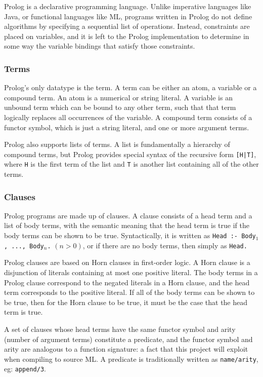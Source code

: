 \documentclass[12pt]{article}
\begin{document}
Prolog is a declarative programming language. 
Unlike imperative languages like Java, or functional languages like ML, programs written in Prolog do not define algorithms by specifying a sequential list of operations. 
Instead, constraints are placed on variables, and it is left to the Prolog implementation to determine in some way the variable bindings that satisfy those constraints. 

\subsubsection{Terms}

Prolog's only datatype is the term. 
A term can be either an atom, a variable or a compound term. 
An atom is a numerical or string literal. 
A variable is an unbound term which can be bound to any other term, such that that term logically replaces all occurrences of the variable. 
A compound term consists of a functor symbol, which is just a string literal, and one or more argument terms.

Prolog also supports lists of terms.
A list is fundamentally a hierarchy of compound terms, but Prolog provides special syntax of the recursive form \verb/[H|T]/, where \verb|H| is the first term of the list and \verb|T| is another list containing all of the other terms.

\subsubsection{Clauses}

Prolog programs are made up of clauses. 
A clause consists of a head term and a list of body terms, with the semantic meaning that the head term is true if the body terms can be shown to be true. 
Syntactically, it is written as \verb|Head :- Body|$_1$\verb|, ..., Body|$_n$\verb|.| $(n > 0)$, or if there are no body terms, then simply as \verb|Head.|

Prolog clauses are based on Horn clauses in first-order logic. 
A Horn clause is a disjunction of literals containing at most one positive literal. 
The body terms in a Prolog clause correspond to the negated literals in a Horn clause, and the head term corresponds to the positive literal. 
If all of the body terms can be shown to be true, then for the Horn clause to be true, it must be the case that the head term is true. 

A set of clauses whose head terms have the same functor symbol and arity (number of argument terms) constitute a predicate, and the functor symbol and arity are analogous to a function signature: a fact that this project will exploit when compiling to source ML.
A predicate is traditionally written as \verb|name/arity|, eg: \verb|append/3|.
\end{document}
